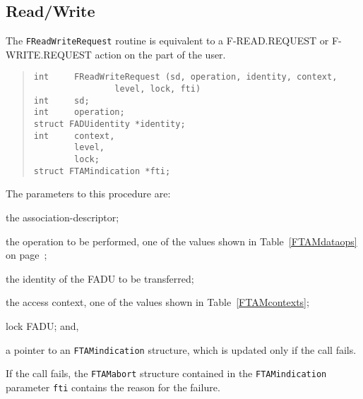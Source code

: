\subsection	{Read/Write}
The \verb"FReadWriteRequest" routine is equivalent to a {\sf
F-READ.REQUEST\/} or {\sf F-WRITE.REQUEST\/} action on the part of the user.
\begin{quote}\small\begin{verbatim}
int     FReadWriteRequest (sd, operation, identity, context,
                level, lock, fti)
int     sd;
int     operation;
struct FADUidentity *identity;
int     context,
        level,
        lock;
struct FTAMindication *fti;
\end{verbatim}\end{quote}
The parameters to this procedure are:
\begin{describe}
\item[\verb"sd":] the association-descriptor;

\item[\verb"operation":] the operation to be performed,
one of the values shown in Table~\ref{FTAMdataops} on
page~\pageref{FTAMdataops};

\item[\verb"identity":] the identity of the FADU to be transferred;

\item[\verb"context"/\verb"level":] the access context,
one of the values shown in Table~\ref{FTAMcontexts};

\item[\verb"lock":] lock FADU;
and,

\item[\verb"fti":] a pointer to an \verb"FTAMindication" structure, which is
updated only if the call fails.
\end{describe}
If the call fails,
the \verb"FTAMabort" structure contained in the
\verb"FTAMindication" parameter \verb"fti" contains the reason for the failure.

